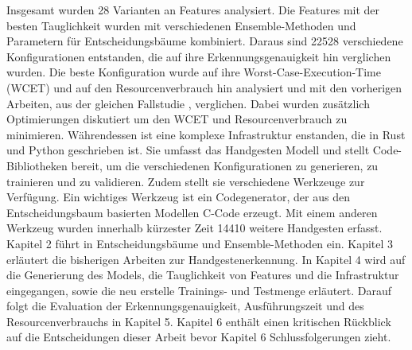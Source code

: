 \newline
\newline
Insgesamt wurden 28 Varianten an Features analysiert. Die Features mit der besten Tauglichkeit wurden mit verschiedenen Ensemble-Methoden und Parametern für Entscheidungsbäume kombiniert. Daraus sind
22528 verschiedene Konfigurationen entstanden, die auf ihre Erkennungsgenauigkeit hin verglichen wurden. Die beste Konfiguration wurde auf ihre Worst-Case-Execution-Time (WCET) und auf den Resourcenverbrauch
hin analysiert und mit den vorherigen Arbeiten, aus der gleichen Fallstudie \cite{venzkeArticle}, verglichen. Dabei wurden zusätzlich Optimierungen diskutiert um den WCET und Resourcenverbrauch zu minimieren.
Währendessen ist eine komplexe Infrastruktur enstanden, die in Rust und Python geschrieben ist. Sie umfasst das Handgesten Modell und stellt Code-Bibliotheken bereit,
um die verschiedenen Konfigurationen zu generieren, zu trainieren und zu validieren. Zudem stellt sie verschiedene Werkzeuge zur Verfügung. Ein wichtiges Werkzeug ist ein Codegenerator,
der aus den Entscheidungsbaum basierten Modellen C-Code erzeugt. Mit einem anderen Werkzeug wurden innerhalb kürzester Zeit 14410 weitere Handgesten erfasst.
\newline
\newline
Kapitel 2 führt in Entscheidungsbäume und Ensemble-Methoden ein. Kapitel 3 erläutert die bisherigen Arbeiten zur Handgestenerkennung. In Kapitel 4 wird auf die Generierung des Models, die Tauglichkeit von
Features und die Infrastruktur eingegangen, sowie die neu erstelle Trainings- und Testmenge erläutert. Darauf folgt die Evaluation der Erkennungsgenauigkeit, Ausführungszeit und des Resourcenverbrauchs in
Kapitel 5. Kapitel 6 enthält einen kritischen Rückblick auf die Entscheidungen dieser Arbeit bevor Kapitel 6 Schlussfolgerungen zieht.